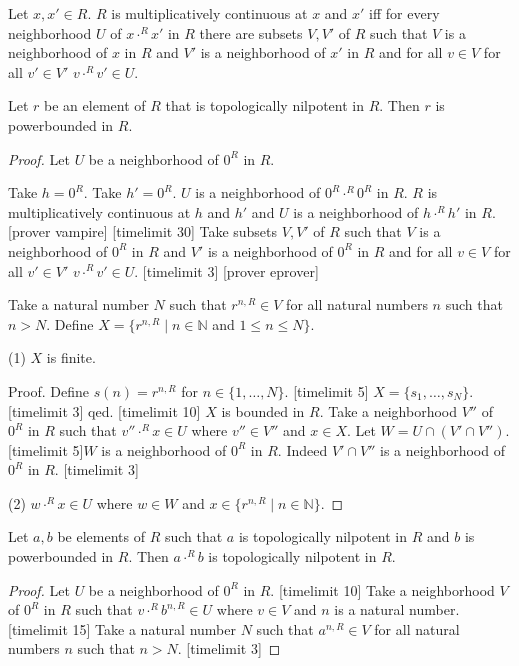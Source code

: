 \documentclass[11pt]{article}
\newcommand{\powers}[2]{\{{#1}^{n,#2} \mid n \in \mathbb{N}\}}
\newcommand{\Seq}[2]{\{#1,\dots,#2\}}
\newcommand{\FinSet}[3]{\{#1_{#2},\dots,#1_{#3}\}}
\begin{document}
\begin{definition}
Let $x,x' \in R$. $R$ is multiplicatively continuous at $x$ and $x'$ iff
for every neighborhood $U$ of $x \cdot^{R} x'$ in $R$
there are subsets $V,V'$ of $R$ such that 
$V$ is a neighborhood of $x$ in $R$ and $V'$ is a neighborhood
of $x'$ in $R$ and for all $v \in V$ for all $v' \in V'$ 
$v \cdot^{R} v' \in U$.
\end{definition}

\begin{forthel}

\begin{theorem}
Let $r$ be an element of $R$ that is topologically nilpotent in $R$.
Then $r$ is powerbounded in $R$.
\end{theorem}
\begin{proof}

Let $U$ be a neighborhood of $0^{R}$ in $R$.

Take $h = 0^{R}$. Take $h' = 0^{R}$.
$U$ is a neighborhood of $0^{R} \cdot^{R} 0^{R}$ in $R$.
$R$ is multiplicatively continuous at $h$ and $h'$ and
$U$ is a neighborhood of $h \cdot^{R} h'$ in $R$.
[prover vampire]
[timelimit 30]
Take subsets $V,V'$ of $R$ such that
$V$ is a neighborhood of $0^{R}$ in $R$ and
$V'$ is a neighborhood of $0^{R}$ in $R$ and
for all $v \in V$ for all $v' \in V'$ 
$v \cdot^{R} v' \in U$.  
[timelimit 3]
[prover eprover]

Take a natural number $N$ such that $r^{n,R} \in V$ 
for all natural numbers $n$ such that $n > N$.
Define $X = \{r^{n,R} \mid n \in \mathbb{N}$ and $1 \leq n \leq N\}$.

(1) $X$ is finite.

Proof. Define $s(n)= r^{n,R}$ for $n \in \Seq{1}{N}$.
[timelimit 5]
$X = \FinSet{s}{1}{N}$.
[timelimit 3]
qed.
[timelimit 10]
$X$ is bounded in $R$.
Take a neighborhood $V''$ of $0^{R}$ in $R$ such that
$v'' \cdot^{R} x \in U$ where $v'' \in V''$ and $x \in X$.
Let $W = U \cap (V' \cap V'')$. 
[timelimit 5]$W$ is a neighborhood
of $0^{R}$ in $R$. Indeed $V' \cap V''$ is a neighborhood
of $0^{R}$ in $R$.
[timelimit 3]

(2) $w \cdot^{R} x \in U$ where $w \in W$ and $x \in \powers{r}{R}$.
    
\end{proof}

\begin{lemma}
Let $a,b$ be elements of $R$ such that $a$ is topologically nilpotent in $R$ and
$b$ is powerbounded in $R$.
Then $a\cdot^{R} b$ is topologically nilpotent in $R$.
\end{lemma}
\begin{proof}
Let $U$ be a neighborhood of $0^{R}$ in $R$.
[timelimit 10]
Take a neighborhood $V$ of $0^{R}$ in $R$ such that
$v \cdot^{R} b^{n,R} \in U$ where $v \in V$ and $n$ is a natural number.
[timelimit 15]
Take a natural number $N$ such that
$a^{n,R} \in V$ for all natural numbers $n$ such that $n > N$.
[timelimit 3]


\end{proof}
\end{forthel}
\end{document}
